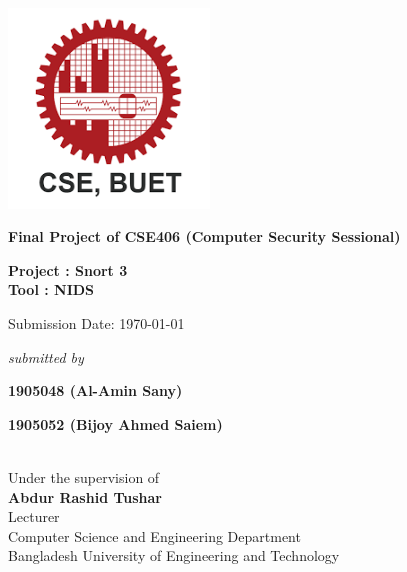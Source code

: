\documentclass{article}
\begin{document}
\begin{center}
\vspace{1.5cm}

\includegraphics[width=0.4\textwidth]{images/buetlogo.png}\\
\vspace{0.3cm}
\vfill

{\LARGE \textbf{ Final Project of CSE406 (Computer Security Sessional)}}

\vspace*{3\baselineskip}

{\LARGE \textbf{Project : Snort 3}}\\
{\LARGE \textbf{Tool : NIDS}}
\begin{large}
\vspace*{2\baselineskip}

Submission Date: \today

\vspace*{2\baselineskip}

\emph{submitted by} \\[1.5ex]
{\Large \textbf{1905048 (Al-Amin Sany)} \\ \par} 
{\Large \textbf{1905052 (Bijoy Ahmed Saiem)} \\ \par} 

\vspace{1.5cm} \\

Under the supervision of \\ %
[\baselineskip] %
\textbf{Abdur Rashid Tushar}\\
Lecturer\\
{Computer Science and Engineering Department}\\
{Bangladesh University of Engineering and Technology}\\

\thispagestyle{empty} 

\end{large}
\end{center}
\pagebreak
\end{document}
